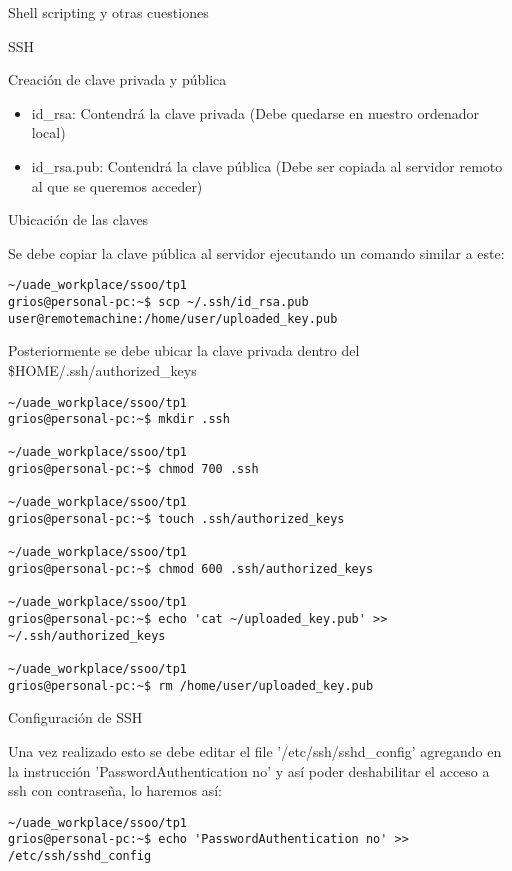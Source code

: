 \begin{section}{Shell scripting y otras cuestiones}
\begin{subsection}{SSH}
\begin{subsubsection}{Creación de clave privada y pública}
\begin{itemize}
\item id\_rsa: Contendrá la clave privada (Debe quedarse en nuestro ordenador local)
\item id\_rsa.pub: Contendrá la clave pública (Debe ser copiada al servidor remoto al que se queremos acceder)
\end{itemize}
\end{subsubsection}

\begin{subsubsection}{Ubicación de las claves}

Se debe copiar la clave pública al servidor ejecutando un comando similar a este:

\begin{lstlisting}[style=Ubuntu]
~/uade_workplace/ssoo/tp1
grios@personal-pc:~$ scp ~/.ssh/id_rsa.pub user@remotemachine:/home/user/uploaded_key.pub
\end{lstlisting}

Posteriormente se debe ubicar la clave privada dentro del \$HOME/.ssh/authorized\_keys

\begin{lstlisting}[style=Ubuntu]
~/uade_workplace/ssoo/tp1
grios@personal-pc:~$ mkdir .ssh

~/uade_workplace/ssoo/tp1
grios@personal-pc:~$ chmod 700 .ssh

~/uade_workplace/ssoo/tp1
grios@personal-pc:~$ touch .ssh/authorized_keys

~/uade_workplace/ssoo/tp1
grios@personal-pc:~$ chmod 600 .ssh/authorized_keys

~/uade_workplace/ssoo/tp1
grios@personal-pc:~$ echo 'cat ~/uploaded_key.pub' >> ~/.ssh/authorized_keys

~/uade_workplace/ssoo/tp1
grios@personal-pc:~$ rm /home/user/uploaded_key.pub
\end{lstlisting}
\end{subsubsection}

\begin{subsubsection}{Configuración de SSH}

Una vez realizado esto se debe editar el file '/etc/ssh/sshd\_config' agregando en la instrucción 'PasswordAuthentication no' y así poder deshabilitar el acceso a ssh con contraseña, lo haremos así:
\begin{lstlisting}[style=Ubuntu]
~/uade_workplace/ssoo/tp1
grios@personal-pc:~$ echo 'PasswordAuthentication no' >> /etc/ssh/sshd_config 
\end{lstlisting}


\end{subsubsection}
\end{subsection}
\end{section}
